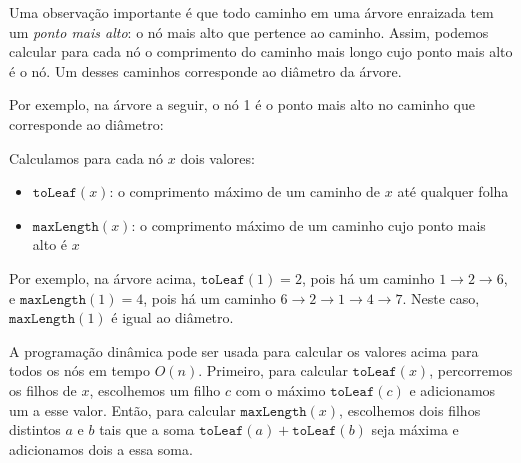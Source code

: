 Uma observação importante é que todo caminho em uma árvore enraizada tem um \emph{ponto mais alto}: o nó mais alto que pertence ao caminho. Assim, podemos calcular para cada nó o comprimento do caminho mais longo cujo ponto mais alto é o nó. Um desses caminhos corresponde ao diâmetro da árvore.

Por exemplo, na árvore a seguir, o nó 1 é o ponto mais alto no caminho que corresponde ao diâmetro:
\begin{center}
\end{center}

Calculamos para cada nó $x$ dois valores:
\begin{itemize}
\item $\texttt{toLeaf}(x)$: o comprimento máximo de um caminho de $x$ até qualquer folha
\item $\texttt{maxLength}(x)$: o comprimento máximo de um caminho cujo ponto mais alto é $x$
\end{itemize}
Por exemplo, na árvore acima, $\texttt{toLeaf}(1)=2$, pois há um caminho $1 \rightarrow 2 \rightarrow 6$, e $\texttt{maxLength}(1)=4$, pois há um caminho $6 \rightarrow 2 \rightarrow 1 \rightarrow 4 \rightarrow 7$. Neste caso, $\texttt{maxLength}(1)$ é igual ao diâmetro.

A programação dinâmica pode ser usada para calcular os valores acima para todos os nós em tempo $O(n)$. Primeiro, para calcular $\texttt{toLeaf}(x)$, percorremos os filhos de $x$, escolhemos um filho $c$ com o máximo $\texttt{toLeaf}(c)$ e adicionamos um a esse valor. Então, para calcular $\texttt{maxLength}(x)$, escolhemos dois filhos distintos $a$ e $b$ tais que a soma $\texttt{toLeaf}(a)+\texttt{toLeaf}(b)$ seja máxima e adicionamos dois a essa soma.

